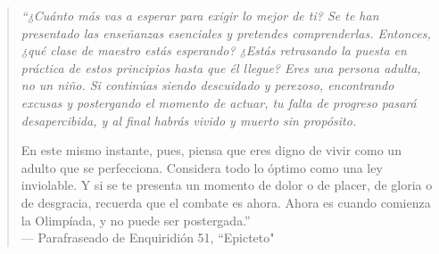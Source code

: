\begin{center}
    \vspace*{3cm} %
    
    \begin{quote}
        \itshape
        “¿Cuánto más vas a esperar para exigir lo mejor de ti? Se te han presentado las enseñanzas esenciales y pretendes comprenderlas. Entonces, ¿qué clase de maestro estás esperando? ¿Estás retrasando la puesta en práctica de estos principios hasta que él llegue? Eres una persona adulta, no un niño. Si continúas siendo descuidado y perezoso, encontrando excusas y postergando el momento de actuar, tu falta de progreso pasará desapercibida, y al final habrás vivido y muerto sin propósito.

        En este mismo instante, pues, piensa que eres digno de vivir como un adulto que se perfecciona. Considera todo lo óptimo como una ley inviolable. Y si se te presenta un momento de dolor o de placer, de gloria o de desgracia, recuerda que el combate es ahora. Ahora es cuando comienza la Olimpíada, y no puede ser postergada.” \\
        \vspace{0.5cm}
        --- Parafraseado de Enquiridión 51, ``Epicteto"
    \end{quote}
    
    \vspace{3cm} %
\end{center}

\newpage

